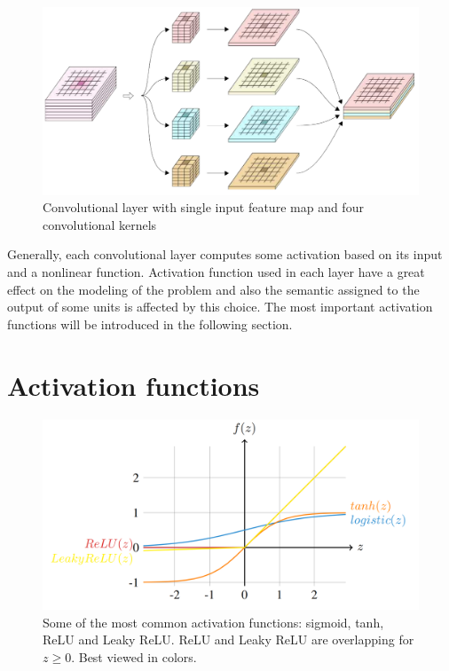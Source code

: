 \begin{figure}
    \begin{center}
        \includegraphics[width=\textwidth]{Figures/2DConvKernels.png}
        \caption{Convolutional layer with single input feature map and four convolutional kernels}
        \label{conv2Dlayer}
    \end{center}
\end{figure}


Generally, each convolutional layer computes some activation based on its input and a nonlinear function. Activation function used in each layer have a great effect on the modeling of the problem and also the semantic assigned to the output of some units is affected by this choice. The most important activation functions will be introduced in the following section.

\section{Activation functions}\label{sec:activations}
\begin{figure}
\centering
\includegraphics[width=\textwidth]{Figures/Actfuncs.png}
\caption{Some of the most common activation functions: sigmoid, tanh, ReLU and Leaky ReLU. ReLU and Leaky ReLU are overlapping for $z \geq 0$. Best viewed in colors.}
\label{fig:activations}
\end{figure}

